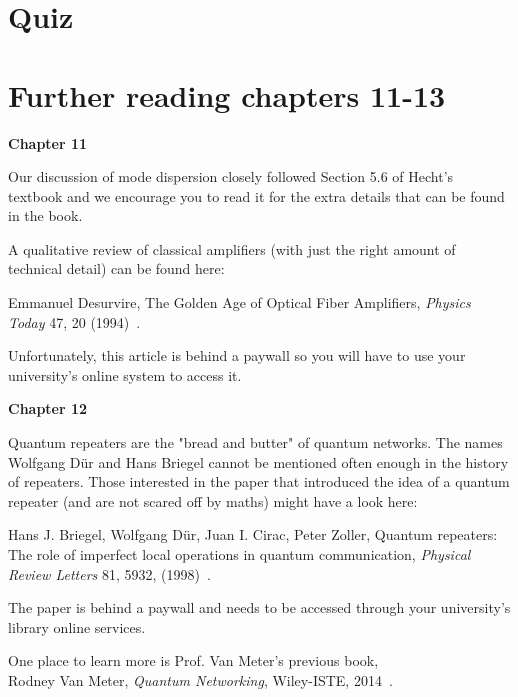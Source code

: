 \newpage
\section*{Quiz}


\section*{Further reading chapters 11-13}

{\bf Chapter 11}

Our discussion of mode dispersion closely followed Section 5.6 of Hecht’s textbook and we encourage you to read it for the extra details that can be found in the book.

A qualitative review of classical amplifiers (with just the right amount of technical detail) can be found here:

Emmanuel Desurvire, The Golden Age of Optical Fiber Amplifiers, \emph{Physics Today} 47, 20 (1994)~\cite{desurvire1994golden}.

Unfortunately, this article is behind a paywall so you will have to use your university’s online system to access it.

{\bf Chapter 12}

Quantum repeaters are the "bread and butter" of quantum networks. The names Wolfgang D\"ur and Hans Briegel cannot be mentioned often enough in the history of repeaters. Those interested in the paper that introduced the idea of a quantum repeater (and are not scared off by maths) might have a look here:

Hans J. Briegel, Wolfgang Dür, Juan I. Cirac, Peter Zoller, Quantum repeaters: The role of imperfect local operations in quantum communication, \emph{Physical Review Letters} 81, 5932, (1998)~\cite{briegel98:_quant_repeater}.

The paper is behind a paywall and needs to be accessed through your university’s library online services.

One place to learn more is Prof. Van Meter's previous book,\\
Rodney Van Meter, \emph{Quantum Networking}, Wiley-ISTE, 2014~\cite{van-meter14:_quantum_networking}.



